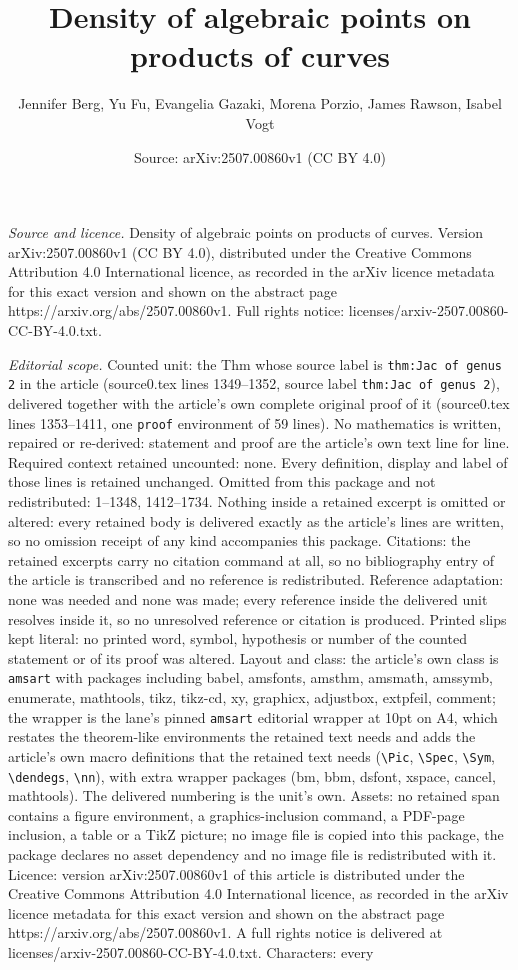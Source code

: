 \documentclass[10pt,a4paper]{amsart}
\title[Density of algebraic points on products of curves]{Density of algebraic points on products of curves}
\author{Jennifer Berg, Yu Fu, Evangelia Gazaki, Morena Porzio, James Rawson, Isabel Vogt}
\date{Source: arXiv:2507.00860v1 (CC BY 4.0)}
\begin{document}
\maketitle

\noindent\emph{Source and licence.} Density of algebraic points on products of curves. Version arXiv:2507.00860v1 (CC BY 4.0), distributed under the Creative Commons Attribution 4.0 International licence, as recorded in the arXiv licence metadata for this exact version and shown on the abstract page https://arxiv.org/abs/2507.00860v1. Full rights notice: licenses/arxiv-2507.00860-CC-BY-4.0.txt.\par\smallskip

\noindent\textit{Editorial scope.} Counted unit: the Thm whose source label is \texttt{thm:Jac of genus 2} in the article (source0.tex lines 1349--1352, source label \texttt{thm:Jac of genus 2}), delivered together with the article's own complete original proof of it (source0.tex lines 1353--1411, one \texttt{proof} environment of 59 lines). No mathematics is written, repaired or re-derived: statement and proof are the article's own text line for line. Required context retained uncounted: none. Every definition, display and label of those lines is retained unchanged. Omitted from this package and not redistributed: 1--1348, 1412--1734. Nothing inside a retained excerpt is omitted or altered: every retained body is delivered exactly as the article's lines are written, so no omission receipt of any kind accompanies this package. Citations: the retained excerpts carry no citation command at all, so no bibliography entry of the article is transcribed and no reference is redistributed. Reference adaptation: none was needed and none was made; every reference inside the delivered unit resolves inside it, so no unresolved reference or citation is produced. Printed slips kept literal: no printed word, symbol, hypothesis or number of the counted statement or of its proof was altered. Layout and class: the article's own class is \texttt{amsart} with packages including babel, amsfonts, amsthm, amsmath, amssymb, enumerate, mathtools, tikz, tikz-cd, xy, graphicx, adjustbox, extpfeil, comment; the wrapper is the lane's pinned \texttt{amsart} editorial wrapper at 10pt on A4, which restates the theorem-like environments the retained text needs and adds the article's own macro definitions that the retained text needs (\texttt{\textbackslash Pic}, \texttt{\textbackslash Spec}, \texttt{\textbackslash Sym}, \texttt{\textbackslash dendegs}, \texttt{\textbackslash nn}), with extra wrapper packages (bm, bbm, dsfont, xspace, cancel, mathtools). The delivered numbering is the unit's own. Assets: no retained span contains a figure environment, a graphics-inclusion command, a PDF-page inclusion, a table or a TikZ picture; no image file is copied into this package, the package declares no asset dependency and no image file is redistributed with it. Licence: version arXiv:2507.00860v1 of this article is distributed under the Creative Commons Attribution 4.0 International licence, as recorded in the arXiv licence metadata for this exact version and shown on the abstract page https://arxiv.org/abs/2507.00860v1. A full rights notice is delivered at licenses/arxiv-2507.00860-CC-BY-4.0.txt. Characters: every 
\end{document}
